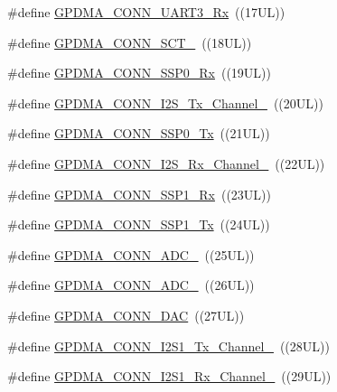 \begin{DoxyCompactItemize}
\item 
\#define \hyperlink{group___g_p_d_m_a__18_x_x__43_x_x_ga4c209fa5df563dc3b97333e34b24335d}{G\+P\+D\+M\+A\+\_\+\+C\+O\+N\+N\+\_\+\+U\+A\+R\+T3\+\_\+\+Rx}~((17\+U\+L))
\item 
\#define \hyperlink{group___g_p_d_m_a__18_x_x__43_x_x_gac4e95b61a35b40087e9c705a69abc873}{G\+P\+D\+M\+A\+\_\+\+C\+O\+N\+N\+\_\+\+S\+C\+T\+\_}~((18\+U\+L))
\item 
\#define \hyperlink{group___g_p_d_m_a__18_x_x__43_x_x_ga35a189ac8738430fd2f0e83147483b39}{G\+P\+D\+M\+A\+\_\+\+C\+O\+N\+N\+\_\+\+S\+S\+P0\+\_\+\+Rx}~((19\+U\+L))
\item 
\#define \hyperlink{group___g_p_d_m_a__18_x_x__43_x_x_ga1b6b56c58670486e2ffe6a0a70c5abce}{G\+P\+D\+M\+A\+\_\+\+C\+O\+N\+N\+\_\+\+I2\+S\+\_\+\+Tx\+\_\+\+Channel\+\_}~((20\+U\+L))
\item 
\#define \hyperlink{group___g_p_d_m_a__18_x_x__43_x_x_gab7a01050fe30674fa02bd3e9c1976819}{G\+P\+D\+M\+A\+\_\+\+C\+O\+N\+N\+\_\+\+S\+S\+P0\+\_\+\+Tx}~((21\+U\+L))
\item 
\#define \hyperlink{group___g_p_d_m_a__18_x_x__43_x_x_ga0f3092d809bf78f82500d312ad0e349a}{G\+P\+D\+M\+A\+\_\+\+C\+O\+N\+N\+\_\+\+I2\+S\+\_\+\+Rx\+\_\+\+Channel\+\_}~((22\+U\+L))
\item 
\#define \hyperlink{group___g_p_d_m_a__18_x_x__43_x_x_ga092169323edc65111c38376bded8ace4}{G\+P\+D\+M\+A\+\_\+\+C\+O\+N\+N\+\_\+\+S\+S\+P1\+\_\+\+Rx}~((23\+U\+L))
\item 
\#define \hyperlink{group___g_p_d_m_a__18_x_x__43_x_x_ga05070551cd6af4e9a24775acfb5aacb5}{G\+P\+D\+M\+A\+\_\+\+C\+O\+N\+N\+\_\+\+S\+S\+P1\+\_\+\+Tx}~((24\+U\+L))
\item 
\#define \hyperlink{group___g_p_d_m_a__18_x_x__43_x_x_gaef5ce2dc7d43ce417fa2fb0540045eee}{G\+P\+D\+M\+A\+\_\+\+C\+O\+N\+N\+\_\+\+A\+D\+C\+\_}~((25\+U\+L))
\item 
\#define \hyperlink{group___g_p_d_m_a__18_x_x__43_x_x_gacf1e0929b5098b0c53d0b41d95c2d7e8}{G\+P\+D\+M\+A\+\_\+\+C\+O\+N\+N\+\_\+\+A\+D\+C\+\_}~((26\+U\+L))
\item 
\#define \hyperlink{group___g_p_d_m_a__18_x_x__43_x_x_ga70d1a4fd7a27ad318e4f4d30a3e8e78d}{G\+P\+D\+M\+A\+\_\+\+C\+O\+N\+N\+\_\+\+D\+AC}~((27\+U\+L))
\item 
\#define \hyperlink{group___g_p_d_m_a__18_x_x__43_x_x_ga8e1d14364364a15c61d47d644f1abed5}{G\+P\+D\+M\+A\+\_\+\+C\+O\+N\+N\+\_\+\+I2\+S1\+\_\+\+Tx\+\_\+\+Channel\+\_}~((28\+U\+L))
\item 
\#define \hyperlink{group___g_p_d_m_a__18_x_x__43_x_x_ga2c29873cef9813b13d69080c783ffc21}{G\+P\+D\+M\+A\+\_\+\+C\+O\+N\+N\+\_\+\+I2\+S1\+\_\+\+Rx\+\_\+\+Channel\+\_}~((29\+U\+L))

\end{DoxyCompactItemize}
